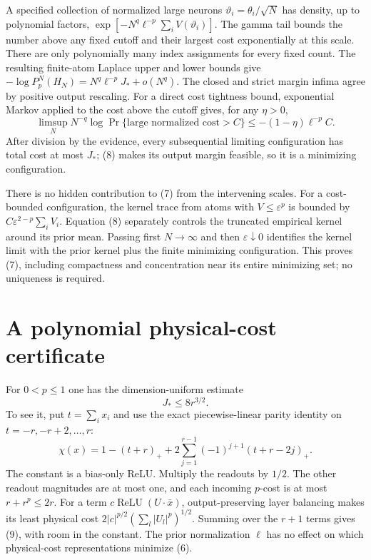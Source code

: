 \documentclass[11pt]{article}
\newcommand{\relu}{\operatorname{ReLU}}
\begin{document}
A specified collection of normalized large neurons
$\vartheta_i=\theta_i/\sqrt N$ has density, up to polynomial factors,
$\exp[-N^q\ell^{-p}\sum_iV(\vartheta_i)]$.
The gamma tail bounds the number above any fixed cutoff and their
largest cost exponentially at this scale. There are only polynomially
many index assignments for every fixed count. The resulting finite-atom
Laplace upper and lower bounds give
$-\log P_p^N(H_N)=N^q\ell^{-p}J_*+o(N^q)$.
The closed and strict margin infima agree by positive output rescaling.
For a direct cost tightness bound, exponential Markov applied to the
cost above the cutoff gives, for any $\eta>0$,
\[
 \limsup_N N^{-q}\log
 \Pr\{\text{large normalized cost}>C\}
                         \le-(1-\eta)\ell^{-p}C.
\]
After division by the evidence, every subsequential limiting
configuration has total cost at most $J_*$; (8) makes its output
margin feasible, so it is a minimizing configuration.

There is no hidden contribution to (7) from the intervening scales.
For a cost-bounded configuration, the kernel trace from atoms with
$V\le\varepsilon^p$ is bounded by
$C\varepsilon^{2-p}\sum_iV_i$. Equation (8) separately controls
the truncated empirical kernel around its prior mean. Passing first
$N\to\infty$ and then $\varepsilon\downarrow0$ identifies the kernel
limit with the prior kernel plus the finite minimizing configuration.
This proves (7), including compactness and concentration near its
entire minimizing set; no uniqueness is required.

\section{A polynomial physical-cost certificate}
For $0<p\le1$ one has the dimension-uniform estimate
\[
                              J_*\le8r^{3/2}.           \tag{9}
\]
To see it, put $t=\sum_i x_i$ and use the exact piecewise-linear parity
identity on $t=-r,-r+2,\ldots,r$:
\[
 \chi(x)=1-(t+r)_+
           +2\sum_{j=1}^{r-1}(-1)^{j+1}(t+r-2j)_+.
 \tag{10}
\]
The constant is a bias-only ReLU. Multiply the readouts by $1/2$.
The other readout magnitudes are at most one, and each incoming
$p$-cost is at most $r+r^p\le2r$.
For a term $c\relu(U\cdot\bar x)$, output-preserving layer balancing
makes its least physical cost
$2|c|^{p/2}(\sum_l|U_l|^p)^{1/2}$.
Summing over the $r+1$ terms gives (9), with room in the constant.
The prior normalization $\ell$ has no effect on which physical-cost
representations minimize (6).
\end{document}
